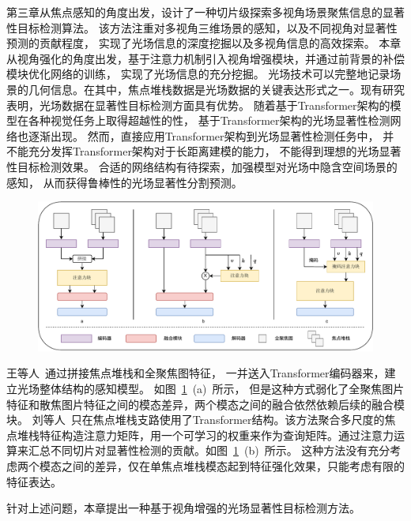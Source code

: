 \label{chap:part4}
%
%
%
%
第三章从焦点感知的角度出发，设计了一种切片级探索多视角场景聚焦信息的显著性目标检测算法。
该方法注重对多视角三维场景的感知，以及不同视角对显著性预测的贡献程度，
实现了光场信息的深度挖掘以及多视角信息的高效探索。
%
%
本章从视角强化的角度出发，基于注意力机制引入视角增强模块，并通过前背景的补偿模块优化网络的训练，
实现了光场信息的充分挖掘。
%
%
%
%
%
%
%
%
光场技术可以完整地记录场景的几何信息。在其中，焦点堆栈数据是光场数据的关键表达形式之一。现有研究表明，光场数据在显著性目标检测方面具有优势。
随着基于Transformer架构的模型在各种视觉任务上取得超越性的性，
基于Transformer架构的光场显著性检测网络也逐渐出现\cite{wang2023tenet,liu2023lftransnet}。
然而，直接应用Transformer架构到光场显著性检测任务中，
并不能充分发挥Transformer架构对于长距离建模的能力，
不能得到理想的光场显著性目标检测效果。
合适的网络结构有待探索，加强模型对光场中隐含空间场景的感知，
从而获得鲁棒性的光场显著性分割预测。
%
%
%
%
\par
\begin{figure}[!ht]
	\centering
	\includegraphics[width=0.95\linewidth]{figures/chapter4/task2_ins.drawio}
	\label{cpt4_fig1:task2_ins}
\end{figure}
%
%
%
%
王等人~\cite{wang2023tenet}通过拼接焦点堆栈和全聚焦图特征，
一并送入Transformer编码器来，建立光场整体结构的感知模型。
如图~\ref{cpt4_fig1:task2_ins}~(a)~所示，
但是这种方式弱化了全聚焦图片特征和散焦图片特征之间的模态差异，两个模态之间的融合依然依赖后续的融合模块。
刘等人~\cite{liu2023lftransnet}只在焦点堆栈支路使用了Transformer结构。该方法聚合多尺度的焦点堆栈特征构造注意力矩阵，用一个可学习的权重来作为查询矩阵。通过注意力运算来汇总不同切片对显著性检测的贡献。如图~\ref{cpt4_fig1:task2_ins}~(b)~所示。
%
%
这种方法没有充分考虑两个模态之间的差异，仅在单焦点堆栈模态起到特征强化效果，只能考虑有限的特征表达。
% 
% 
% 
% 
\par
针对上述问题，本章提出一种基于视角增强的光场显著性目标检测方法。
